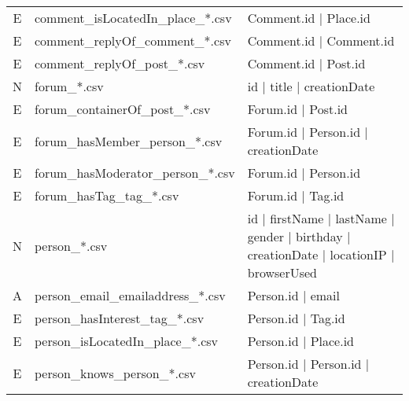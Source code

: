 \begin{table}[htb]
\begin{tabular}{|c|p{4.6cm}|p{9.8cm}|}
        E                       & comment\_isLocatedIn\_place\_*.csv      & Comment.id | Place.id                                                                   \\
        E                       & comment\_replyOf\_comment\_*.csv        & Comment.id | Comment.id                                                                 \\
        E                       & comment\_replyOf\_post\_*.csv           & Comment.id | Post.id                                                                    \\
        \hline
        N                       & forum\_*.csv                            & id | title | creationDate                                                               \\
        E                       & forum\_containerOf\_post\_*.csv         & Forum.id | Post.id                                                                      \\
        E                       & forum\_hasMember\_person\_*.csv         & Forum.id | Person.id | creationDate                                                     \\
        E                       & forum\_hasModerator\_person\_*.csv      & Forum.id | Person.id                                                                    \\
        E                       & forum\_hasTag\_tag\_*.csv               & Forum.id | Tag.id                                                                       \\
        \hline
        N                       & person\_*.csv                           & id | firstName | lastName | gender | birthday | creationDate | locationIP | browserUsed \\
        A                       & person\_email\_emailaddress\_*.csv      & Person.id | email                                                                       \\
        E                       & person\_hasInterest\_tag\_*.csv         & Person.id | Tag.id                                                                      \\
        E                       & person\_isLocatedIn\_place\_*.csv       & Person.id | Place.id                                                                    \\
        E                       & person\_knows\_person\_*.csv            & Person.id | Person.id | creationDate                                                    \\

\end{tabular}
\end{table}
